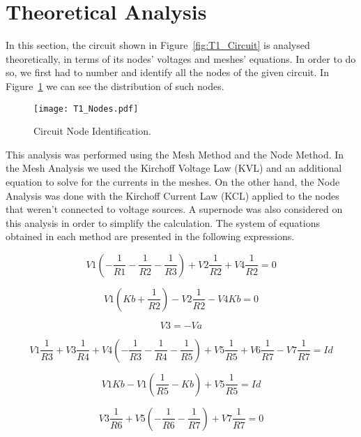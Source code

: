 \section{Theoretical Analysis}
\label{sec:analysis}

In this section, the circuit shown in Figure~\ref{fig:T1_Circuit} is analysed theoretically, in terms of its nodes' voltages and meshes' equations.
In order to do so, we first had to number and identify all the nodes of the given circuit. In Figure~\ref{fig:T1_Nodes} we can see the distribution of such nodes.

\begin{figure}[h] \centering
\texttt{[image: T1\_Nodes.pdf]}
\caption{Circuit Node Identification.}
\label{fig:T1_Nodes}
\end{figure}

This analysis was performed using the Mesh Method and the Node Method. In the Mesh Analysis we used the Kirchoff Voltage Law (KVL) and an additional equation to solve for the currents in the meshes. On the other hand, the Node Analysis was done with the Kirchoff Current Law (KCL) applied to the nodes that weren't connected to voltage sources. A supernode was also considered on this analysis in order to simplify the calculation.  
The system of equations obtained in each method are presented in the following expressions.

\begin{equation}
  V1(-\frac{1}{R1}-\frac{1}{R2}-\frac{1}{R3}) + V2\frac{1}{R2} + V4\frac{1}{R2} = 0
\end{equation}

\begin{equation}
  V1(Kb+\frac{1}{R2}) -V2\frac{1}{R2} - V4Kb = 0
\end{equation}

\begin{equation}
  V3=-Va
\end{equation}

\begin{equation}
  V1\frac{1}{R3} + V3\frac{1}{R4} + V4(-\frac{1}{R3}-\frac{1}{R4}-\frac{1}{R5}) + V5\frac{1}{R5} + V6\frac{1}{R7} - V7\frac{1}{R7} = Id
\end{equation}

\begin{equation}
  V1Kb - V1(\frac{1}{R5}-Kb) + V5\frac{1}{R5}= Id
\end{equation}

\begin{equation}
  V3\frac{1}{R6} + V5(-\frac{1}{R6}-\frac{1}{R7}) + V7\frac{1}{R7}= 0
\end{equation}

